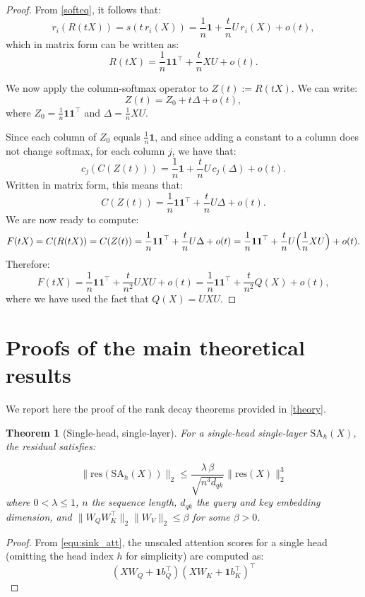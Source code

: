 \documentclass{article}
\theoremstyle{definition}
\theoremstyle{plain}
\newtheorem{theorem}{Theorem}
\begin{document}
\begin{appendices}
\begin{proof}
From \ref{softeq}, it follows that:
\[
r_i(R(tX))=s(t\,r_i(X))=\frac{1}{n}\mathbf{1}+\frac{t}{n}U\,r_i(X)+o(t), 
\]
which in matrix form can be written as:
\[
R(tX)=\frac{1}{n}\mathbf{1}\mathbf{1}^\top+\frac{t}{n}XU+o(t). 
\]

We now apply the column-softmax operator to $Z(t):=R(tX)$. We can write: 
\[
Z(t)=Z_0+t\Delta+o(t),
\]
where $Z_0=\frac{1}{n}\mathbf{1}\mathbf{1}^\top$ and $\Delta=\frac{1}{n}XU$.

Since each column of $Z_0$ equals $\frac{1}{n}\mathbf{1}$, and since adding a constant to a column does not change softmax, for each column $j$, we have that: 
\[
c_j(C(Z(t)))=\frac{1}{n}\mathbf{1}+\frac{t}{n}U\,c_j(\Delta)+o(t). 
\]
Written in matrix form, this means that: 
\[
C(Z(t))=\frac{1}{n}\mathbf{1}\mathbf{1}^\top+\frac{t}{n}U\Delta+o(t).
\]
We are now ready to compute:
\[
F(tX)=C(R(tX))=C(Z(t))
=
\frac{1}{n}\mathbf{1}\mathbf{1}^\top+\frac{t}{n}U\Delta+o(t)
=
\frac{1}{n}\mathbf{1}\mathbf{1}^\top+\frac{t}{n}U\Bigl(\frac{1}{n}XU\Bigr)+o(t).
\]
Therefore:
\[
F(tX)
=
\frac{1}{n}\mathbf{1}\mathbf{1}^\top+\frac{t}{n^2}UXU+o(t)
=
\frac{1}{n}\mathbf{1}\mathbf{1}^\top+\frac{t}{n^2}Q(X)+o(t),
\]
where we have used the fact that $Q(X)=UXU$.
\end{proof}

\section{Proofs of the main {theoretical} results}\label{app-main}

We report here the proof of the {rank decay} theorems {provided in \cref{theory}}.

\begin{theorem}[Single-head, single-layer]
\label{thm:residual} 
{For a single-head single-layer $\mathrm{SA}_h(X)$,} the residual satisfies:

\[
\boxed{
\|\mathrm{res}(\mathrm{SA}{_h}(X))\|_2
\le
\frac{\lambda\,\beta}{\sqrt{n^{3}d_{qk}}}
\|\mathrm{res}(X)\|_2^3 
}
\]
where $0 < \lambda \leq 1$, $n$ the sequence length, $d_{qk}$ the query and key embedding dimension, and $\|W_Q W_K^\top\|_2\|W_V\|_2 \le \beta$ for some $\beta > 0$.
\end{theorem}

\begin{proof}

From \ref{equ:sink_att}, the unscaled attention scores for a single head (omitting the head index $h$ for simplicity) are computed as:
\begin{equation}
(X W_Q + \mathbf{1} b_Q^\top)(X W_K + \mathbf{1} b_K^\top)^\top
\label{eq:unscaled_attention}
\end{equation}


\end{proof}
\end{appendices}
\end{document}
